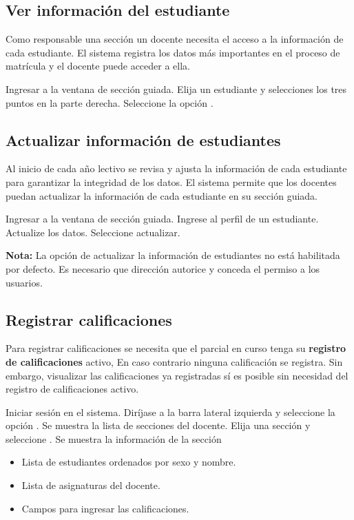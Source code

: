 \documentclass[12pt]{article}
\begin{document}
    \subsection{Ver información del estudiante}

    Como responsable una sección un docente necesita el acceso a la información de cada estudiante.
    El sistema \wsm registra los datos más importantes en el proceso de matrícula y el docente puede acceder a ella.

    \stepTitle

     Ingresar a la ventana de sección guiada.
     Elija un estudiante y selecciones los tres puntos en la parte derecha.
     Seleccione la opción .


    \subsection{Actualizar información de estudiantes}

    Al inicio de cada año lectivo se revisa y ajusta la información de cada estudiante para garantizar la integridad de los datos.
    El sistema \wsm permite que los docentes puedan actualizar la información de cada estudiante en su sección guiada.

    \stepTitle
     Ingresar a la ventana de sección guiada.
     Ingrese al perfil de un estudiante.
     Actualize los datos.
     Seleccione actualizar.

    \textbf{Nota:} La opción de actualizar la información de estudiantes no está habilitada por defecto.
    Es necesario que dirección autorice y conceda el permiso a los usuarios.


    \subsection{Registrar calificaciones}

    Para registrar calificaciones se necesita que el parcial en curso tenga su \textbf{registro de calificaciones} activo,
    En caso contrario ninguna calificación se registra.
    Sin embargo, visualizar las calificaciones ya registradas sí es posible sin necesidad del registro de calificaciones activo.

    \stepTitle
     Iniciar sesión en el sistema.
     Diríjase a la barra lateral izquierda y seleccione la opción .
     Se muestra la lista de secciones del docente.
     Elija una sección y seleccione .
     Se muestra la información de la sección
    \begin{itemize}
        \item Lista de estudiantes ordenados por sexo y nombre.
        \item Lista de asignaturas del docente.
        \item Campos para ingresar las calificaciones.
    \end{itemize}
\end{document}
